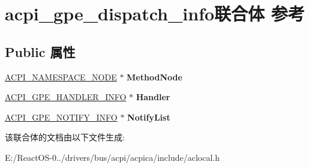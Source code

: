 \hypertarget{unionacpi__gpe__dispatch__info}{}\section{acpi\+\_\+gpe\+\_\+dispatch\+\_\+info联合体 参考}
\label{unionacpi__gpe__dispatch__info}
\subsection*{Public 属性}
\begin{DoxyCompactItemize}
\item 
\mbox{\label{unionacpi__gpe__dispatch__info_afa7092ef79a5f038068bb52fad1147a5}} 
\hyperlink{structacpi__namespace__node}{A\+C\+P\+I\+\_\+\+N\+A\+M\+E\+S\+P\+A\+C\+E\+\_\+\+N\+O\+DE} $\ast$ {\bfseries Method\+Node}
\item 
\mbox{\label{unionacpi__gpe__dispatch__info_a2931a3962db8ccbf8370fd211c4a4f19}} 
\hyperlink{structacpi__gpe__handler__info}{A\+C\+P\+I\+\_\+\+G\+P\+E\+\_\+\+H\+A\+N\+D\+L\+E\+R\+\_\+\+I\+N\+FO} $\ast$ {\bfseries Handler}
\item 
\mbox{\label{unionacpi__gpe__dispatch__info_ab8c912cc1bc6e450c567261e577fa9f6}} 
\hyperlink{structacpi__gpe__notify__info}{A\+C\+P\+I\+\_\+\+G\+P\+E\+\_\+\+N\+O\+T\+I\+F\+Y\+\_\+\+I\+N\+FO} $\ast$ {\bfseries Notify\+List}
\end{DoxyCompactItemize}


该联合体的文档由以下文件生成\+:\begin{DoxyCompactItemize}
\item 
E\+:/\+React\+O\+S-\/0../drivers/bus/acpi/acpica/include/aclocal.\+h\end{DoxyCompactItemize}

